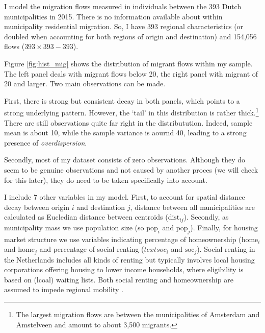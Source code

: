 \documentclass[fleqn,10pt]{SelfArx} %
\begin{document}
        I model the migration flows measured in individuals between
        the 393 Dutch municipalities in 2015. There is no information
        available about within municipality residential migration. So,
        I have 393 regional characteristics (or doubled when
        accounting for both regions of origin and destination) and
        154,056 flows ($393 \times 393 - 393$). 

        Figure \ref{fig:hist_mig} shows the distribution of migrant
        flows within my sample. The left panel deals with migrant
        flows below 20, the right panel with migrant of 20 and
        larger. Two main observations can be made.

        First, there is strong but consistent decay in both panels,
        which points to a strong underlying pattern. However, the
        `tail' in this distribution is rather thick.\footnote{The
          largest migration flows are between the municipalities of
          Amsterdam and Amstelveen and amount to about 3,500
          migrants.} There are still observations quite far right in
        the distributution. Indeed, sample mean is about 10, while the
        sample variance is aournd 40, leading to a strong presence of
        \emph{overdispersion}.

        Secondly, most of my dataset consists of zero
        observations. Although they do seem to be genuine observations
        and not caused by another proces (we will check for this
        later), they do need to be taken specifically into account. 

        I include 7 other variables in my model. First, to account for
        spatial distance decay between origin $i$ and destination $j$,
        distance between all municipalities are calculated as
        Eucledian distance between centroids
        ($\text{dist}_{ij}$). Secondly, as municipality mass we use
        population size (so $\text{pop}_i$ and
        $\text{pop}_j$). Finally, for housing market structure we use
        variables indicating percentage of homeownership
        ($\text{home}_i$ and $\text{home}_j$ and percentage of social
        renting ($text{soc}_i$ and $\text{soc}_j$). Social renting in
        the Netherlands includes all kinds of renting but typically
        involves local housing corporations offering housing to lower
        income households, where eligibility is based on (lcoal) waiting
        lists. Both social renting and homeownership are assumed to
        impede regional mobility \citep{de2009homeownership}.
\end{document}
